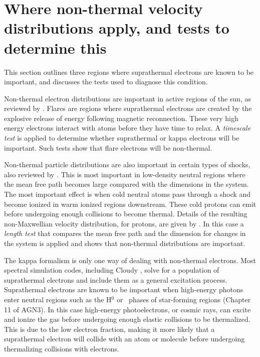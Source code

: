 \documentclass[debug, preprint, twocolumn]{rmaa}
\begin{document}
\section{Where non-thermal velocity distributions apply, and tests to determine this}
\label{sec:where}
This section outlines three regions where suprathermal electrons are known to be important,
and discusses the  tests used to diagnose this condition.

Non-thermal electron distributions are  important in active regions of the sun, 
as reviewed by \citet{2013SSRv..178..271B}.
Flares are regions where suprathermal electrons are created by the
explosive release of energy following magnetic reconnection.
These very high energy electrons interact with atoms before they have time to relax.
A \emph{timescale test} is applied to determine whether suprathermal or kappa electrons will be important.
Such tests show that flare electrons will be non-thermal.

Non-thermal particle distributions are also important in certain types of shocks, also reviewed by 
\citet{2013SSRv..178..271B}.
This is most important in low-density neutral regions where the  mean free path becomes large
compared with the dimensions in the system.  The most important effect is when cold 
neutral atoms  pass through a shock and become ionized in warm ionized regions downstream.  
These cold protons can emit
before undergoing enough collisions to become thermal.  
Details of the resulting non-Maxwellian velocity distribution, for protons,
are given by \citet{2008ApJ...682..408R}.
In this case a \emph{length test} that compares the mean free path and the dimension
for changes in the system is applied and shows that non-thermal distributions are important.

The kappa formalism is only one way of dealing with non-thermal electrons.
Most spectral simulation codes, including Cloudy \citep{CloudyReview13}, solve for a population of suprathermal electrons
and include them as a general excitation process.
Suprathermal electrons are known to be important 
when high-energy photons enter
neutral regions such as the H$^0$  or \htwo\ phases
of star-forming regions 
(Chapter 11 of AGN3).
In this case high-energy photoelectrons, or cosmic rays, can excite and ionize the gas before
undergoing enough elastic collisions to be thermalized.
This is due to the low electron fraction, making it more likely that a suprathermal electron will collide
with an atom or molecule before undergoing thermalizing collisions with electrons.
\end{document}
